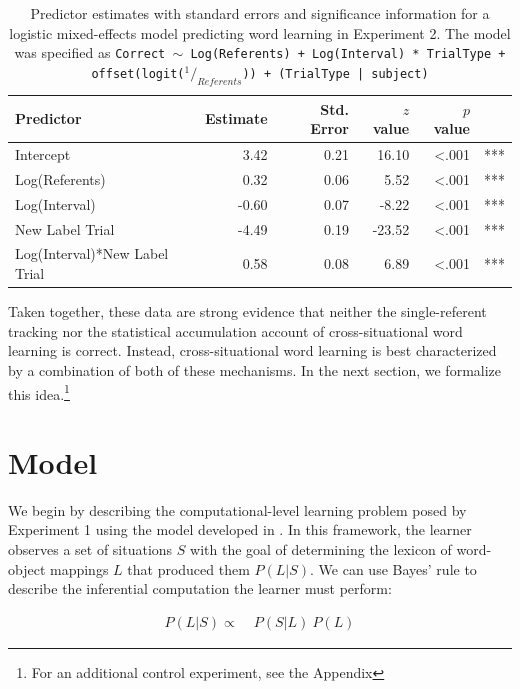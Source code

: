 \documentclass[man,floatsintext]{apa6}
\begin{document}
\begin{table}[tb]
\begin{center}
\begin{tabular}{lrrrrl}
 Predictor & Estimate & Std. Error & $z$ value & $p$ value &  \\ 
  \hline
  Intercept & 3.42 & 0.21 & 16.10 & <.001 & *** \\ 
  Log(Referents) & 0.32 & 0.06 & 5.52 & <.001 & *** \\ 
  Log(Interval) & -0.60 & 0.07 & -8.22 & <.001 & *** \\ 
  New Label Trial & -4.49 & 0.19 & -23.52 & <.001 & *** \\ 
  Log(Interval)*New Label Trial & 0.58 & 0.08 & 6.89 & <.001 & *** \\ 
   \hline
\end{tabular}
\end{center}
\caption{\label{tab:exp2_reg}Predictor estimates with standard errors and significance information for a logistic mixed-effects model predicting word learning in Experiment 2. The model was specified as \small{\tt{Correct $\sim$ Log(Referents) + Log(Interval) * TrialType + offset(logit($^1/_{Referents}$)) + (TrialType | subject)}}}
\end{table}

Taken together, these data are strong evidence that neither the single-referent tracking nor the statistical accumulation account of cross-situational word learning is correct. Instead, cross-situational word learning is best characterized by a combination of both of these mechanisms. In the next section, we formalize this idea.\footnote{For an additional control experiment, see the Appendix}

\section{Model}

We begin by describing the computational-level learning problem posed by Experiment 1 using the model developed in . In this framework, the learner observes a set of situations $S$ with the goal of determining the lexicon of word-object mappings $L$ that produced them $P(L|S)$. We can use Bayes' rule to describe the inferential computation the learner must perform: 

\begin{align} 
P(L|S) \propto & \;P(S|L) \: P(L) \label{eq:wurwur1}
\end{align}
\end{document}
